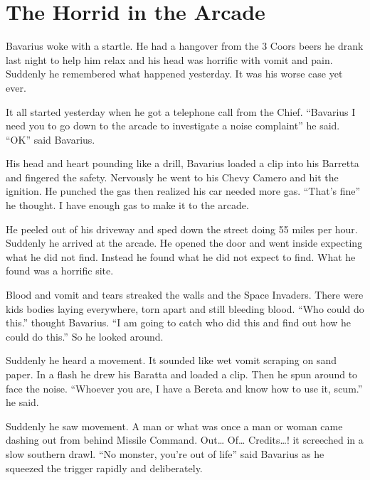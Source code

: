 \chapter{The Horrid in the Arcade}



Bavarius woke with a startle. He had a hangover from the 3 Coors
beers he drank last night to help him relax and his head was
horrific with vomit and pain. Suddenly he remembered what happened
yesterday. It was his worse case yet ever.



It all started yesterday when he got a telephone call from the
Chief. ``Bavarius I need you to go down to the arcade to investigate
a noise complaint'' he said. ``OK'' said Bavarius.



His head and heart pounding like a drill, Bavarius loaded a clip
into his Barretta and fingered the safety. Nervously he went to his
Chevy Camero and hit the ignition. He punched the gas then realized
his car needed more gas. ``That's fine'' he thought. I have enough
gas to make it to the arcade.



He peeled out of his driveway and sped down the street doing 55
miles per hour. Suddenly he arrived at the arcade. He opened the
door and went inside expecting what he did not find. Instead he
found what he did not expect to find. What he found was a horrific
site.



Blood and vomit and tears streaked the walls and the Space
Invaders. There were kids bodies laying everywhere, torn apart and
still bleeding blood. ``Who could do this.'' thought Bavarius. ``I am
going to catch who did this and find out how he could do this.'' So
he looked around.



Suddenly he heard a movement. It sounded like wet vomit scraping on
sand paper. In a flash he drew his Baratta and loaded a clip. Then
he spun around to face the noise. ``Whoever you are, I have a Bereta
and know how to use it, scum.'' he said.



Suddenly he saw movement. A man or what was once a man or woman
came dashing out from behind Missile Command. {\sc Out\ldots{} Of\ldots{}
Credits\ldots{}!} it screeched in a slow southern drawl. ``No monster,
you're out of life'' said Bavarius as he squeezed the trigger
rapidly and deliberately.



